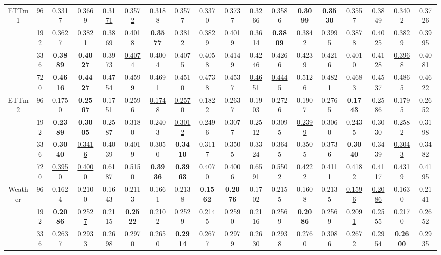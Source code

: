 \begin{table}[htbp]
{\begin{tabular}{@{}cc*{16}{c}@{}}
\midrule
\multirow{4}{*}{ETTm1} & 96 & 0.3317 & 0.3669 & \underline{0.3171} & \underline{0.3572} & 0.3188 & 0.3577 & 0.3370 & 0.3737 & 0.3266 & 0.3586 & \textbf{0.3099} & \textbf{0.3530} & 0.3557 & 0.3849 & 0.3402 & 0.3726 \\
 & 192 & 0.3627 & 0.3821 & 0.3869 & 0.4018 & \textbf{0.3577} & \underline{0.3812} & 0.3829 & 0.4019 & \underline{0.3614} & \textbf{0.3809} & 0.3842 & 0.3995 & 0.3878 & 0.4025 & 0.3829 & 0.3995 \\
 & 336 & \textbf{0.3889} & \textbf{0.4027} & 0.3973 & \underline{0.4074} & 0.4004 & 0.4075 & 0.4058 & 0.4149 & 0.4246 & 0.4266 & 0.4239 & 0.4216 & 0.4010 & 0.4128 & \underline{0.3968} & 0.4081 \\
 & 720 & \textbf{0.4616} & \textbf{0.4427} & 0.4754 & 0.4599 & 0.4691 & 0.4510 & 0.4738 & 0.4537 & \underline{0.4651} & \underline{0.4445} & 0.5126 & 0.4821 & 0.4683 & 0.4537 & 0.4865 & 0.4622 \\
\midrule
\multirow{4}{*}{ETTm2} & 96 & 0.1750 & \textbf{0.2567} & 0.1751 & 0.2596 & \underline{0.1748} & \underline{0.2570} & 0.1822 & 0.2637 & 0.1903 & 0.2726 & 0.1907 & 0.2765 & \textbf{0.1743} & 0.2586 & 0.1795 & 0.2652 \\
 & 192 & \textbf{0.2389} & \textbf{0.3005} & 0.2587 & 0.3180 & 0.2403 & \underline{0.3012} & 0.2496 & 0.3077 & 0.2512 & 0.3095 & \underline{0.2399} & 0.3060 & 0.2435 & 0.3030 & 0.2582 & 0.3198 \\
 & 336 & \textbf{0.3040} & \underline{0.3416} & 0.4039 & 0.4019 & 0.3050 & \textbf{0.3410} & 0.3117 & 0.3505 & 0.3324 & 0.3645 & 0.3505 & 0.3736 & \textbf{0.3040} & 0.3439 & \underline{0.3043} & 0.3482 \\
 & 720 & \underline{0.3950} & \underline{0.4000} & 0.6187 & 0.5150 & \textbf{0.3936} & \textbf{0.3963} & 0.4070 & 0.4006 & 0.6591 & 0.5502 & 0.4222 & 0.4111 & 0.4182 & 0.4117 & 0.4319 & 0.4195 \\
\midrule
\multirow{4}{*}{Weather} & 96 & 0.1624 & 0.2100 & 0.1643 & 0.2113 & 0.1661 & 0.2138 & \textbf{0.1562} & \textbf{0.2076} & 0.1702 & 0.2155 & 0.1608 & 0.2135 & \underline{0.1596} & \underline{0.2086} & 0.1630 & 0.2141 \\
 & 192 & \textbf{0.2086} & \underline{0.2527} & 0.2115 & \textbf{0.2522} & 0.2102 & 0.2529 & 0.2145 & 0.2590 & 0.2116 & 0.2569 & \textbf{0.2086} & 0.2569 & \underline{0.2091} & 0.2555 & 0.2170 & 0.2652 \\
 & 336 & 0.2637 & \underline{0.2933} & 0.2698 & 0.2970 & 0.2650 & \textbf{0.2914} & 0.2677 & 0.2979 & \underline{0.2630} & 0.2938 & 0.2760 & 0.3086 & 0.2672 & 0.2954 & \textbf{0.2600} & 0.2935 \\

\end{tabular}}
\end{table}
